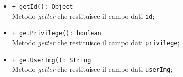 \begin{itemize}
\begin{itemize}
				\item \texttt{+ getId(): Object} \\
				Metodo \textit{getter} che restituisce il campo dati \texttt{id};
				
				\item \texttt{+ getPrivilege(): boolean} \\
				Metodo \textit{getter} che restituisce il campo dati \texttt{privilege};
				
				\item \texttt{+ getUserImg(): String} \\
				Metodo \textit{getter} che restituisce il campo dati \texttt{userImg};
				
			\end{itemize}
		\end{itemize}	
		
		